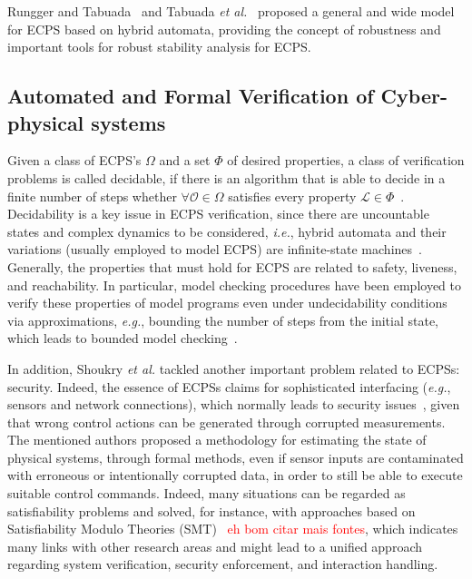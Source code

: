 \documentclass[format=acmsmall, review=false, screen=true]{acmart}
\begin{document}
Rungger and Tabuada~\cite{Rungger16} and Tabuada {\it et al.}~\cite{Tabuada14} proposed a general and wide model for ECPS based on hybrid automata, providing the concept of robustness and important tools for robust stability analysis for ECPS.








\subsection{Automated and Formal Verification of Cyber-physical systems}
\label{ssec:verification}

Given a class of ECPS's $\Omega$ and a set $\Phi$ of desired properties, a class of verification problems is called decidable, if there is an algorithm that is able to decide in a finite number of steps whether $\forall \mathcal{O}\in\Omega$ satisfies every property $\mathcal{L}\in \Phi$~\cite{Alur00}. Decidability is a key issue in ECPS verification, since there are uncountable states and complex dynamics to be considered, {\it i.e.}, hybrid automata and their variations (usually employed to model ECPS) are infinite-state machines~\cite{Henzinger95}. Generally, the properties that must hold for ECPS are related to safety, liveness, and reachability. In particular, model checking procedures have been employed to verify these properties of model programs even under undecidability conditions via approximations, {\it e.g.}, bounding the number of steps from the initial state, which leads to bounded model checking~\cite{Veanes09}.

In addition, Shoukry {\it et al.} \cite{Shoukry} tackled another important problem related to ECPSs: security. Indeed, the essence of ECPSs claims for sophisticated interfacing ({\it e.g.}, sensors and network connections), which normally leads to security issues~\cite{cpsattack}, given that wrong control actions can be generated through corrupted measurements. The mentioned authors proposed a methodology for estimating the state of physical systems, through formal methods, even if sensor inputs are contaminated with erroneous or intentionally corrupted data, in order to still be able to execute suitable control commands. Indeed, many situations can be regarded as satisfiability problems and solved, for instance, with approaches based on Satisfiability Modulo Theories (SMT)~\cite{Araujo16} \textcolor{red}{eh bom citar mais fontes}, which indicates many links with other research areas and might lead to a unified approach regarding system verification, security enforcement, and interaction handling.
\end{document}

